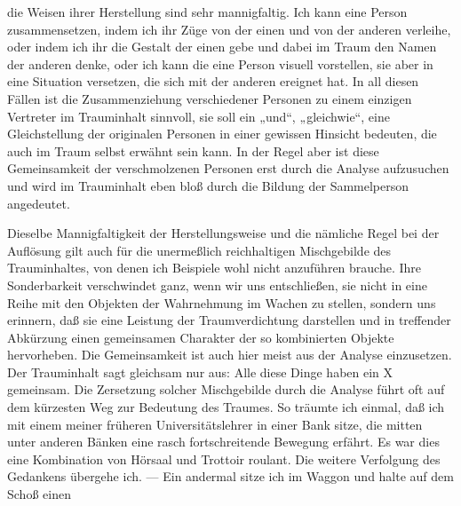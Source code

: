 \documentclass{article}
\begin{document}
         
            
            
            
        \pstart
        die Weisen ihrer Herstellung sind sehr mannigfaltig. Ich kann eine
               Person zusammensetzen, indem ich ihr Züge von der einen und von der anderen
               verleihe, oder indem ich ihr die Gestalt der einen gebe und dabei im Traum den
               Namen der anderen denke, oder ich kann die eine Person visuell vorstellen, sie
               aber in eine Situation versetzen, die sich mit der anderen ereignet hat. In
               all diesen Fällen ist die Zusammenziehung verschiedener Personen zu einem
               einzigen Vertreter im Trauminhalt sinnvoll, sie soll ein „und“, „gleichwie“,
               eine Gleichstellung der originalen Personen in einer gewissen Hinsicht bedeuten,
               die auch im Traum selbst erwähnt sein kann. In der Regel aber ist diese
               Gemeinsamkeit der verschmolzenen Personen erst durch die Analyse aufzusuchen und
               wird im Trauminhalt eben bloß durch die Bildung der Sammelperson angedeutet.
        \pend
    
            
        \pstart
        Dieselbe Mannigfaltigkeit der Herstellungsweise und die nämliche Regel bei der
               Auflösung gilt auch für die unermeßlich reichhaltigen Mischgebilde
               des Trauminhaltes, von denen ich Beispiele wohl nicht anzuführen brauche. Ihre
               Sonderbarkeit verschwindet ganz, wenn wir uns entschließen, sie nicht in eine
               Reihe mit den Objekten der Wahrnehmung im Wachen zu stellen, sondern uns
               erinnern, daß sie eine Leistung der Traumverdichtung darstellen und
               in treffender Abkürzung einen gemeinsamen Charakter der so kombinierten Objekte
               hervorheben. Die Gemeinsamkeit ist auch hier meist aus der Analyse einzusetzen.
               Der Trauminhalt sagt gleichsam nur aus: Alle diese
                  Dinge haben ein X gemeinsam. Die Zersetzung solcher Mischgebilde durch
               die Analyse führt oft auf dem kürzesten Weg zur Bedeutung des Traumes. So
               träumte ich einmal, daß ich mit einem meiner früheren Universitätslehrer in
               einer Bank sitze, die mitten unter anderen Bänken eine rasch fortschreitende
               Bewegung erfährt. Es war dies eine Kombination von Hörsaal und Trottoir
               roulant. Die weitere Verfolgung des Gedankens übergehe ich. — Ein andermal
               sitze ich im Waggon und halte auf dem Schoß einen
        \pend
    
\end{document}
